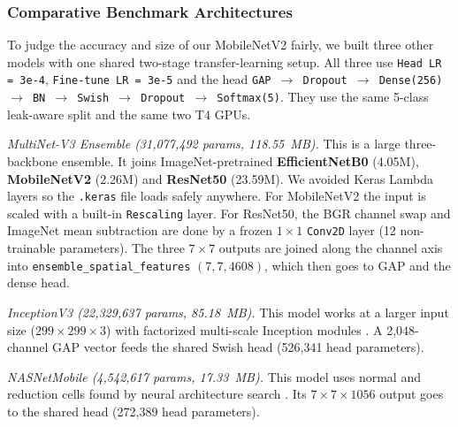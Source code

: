\subsubsection{Comparative Benchmark Architectures}
To judge the accuracy and size of our MobileNetV2 fairly, we built three other models with one shared two-stage transfer-learning setup. All three use \texttt{Head LR = 3e-4}, \texttt{Fine-tune LR = 3e-5} and the head \texttt{GAP $\rightarrow$ Dropout $\rightarrow$ Dense(256) $\rightarrow$ BN $\rightarrow$ Swish $\rightarrow$ Dropout $\rightarrow$ Softmax(5)}. They use the same 5-class leak-aware split and the same two T4 GPUs.

\textit{MultiNet-V3 Ensemble (31,077,492 params, 118.55~MB).} This is a large three-backbone ensemble. It joins ImageNet-pretrained \textbf{EfficientNetB0} \cite{tan2019efficientnet} (4.05M), \textbf{MobileNetV2} \cite{sandler2018mobilenetv2} (2.26M) and \textbf{ResNet50} \cite{he2016deep} (23.59M). We avoided Keras Lambda layers so the \texttt{.keras} file loads safely anywhere. For MobileNetV2 the input is scaled with a built-in \texttt{Rescaling} layer. For ResNet50, the BGR channel swap and ImageNet mean subtraction are done by a frozen $1 \times 1$ \texttt{Conv2D} layer (12 non-trainable parameters). The three $7 \times 7$ outputs are joined along the channel axis into \texttt{ensemble\_\allowbreak spatial\_\allowbreak features} $(7, 7, 4608)$, which then goes to GAP and the dense head.

\textit{InceptionV3 (22,329,637 params, 85.18~MB).} This model works at a larger input size ($299 \times 299 \times 3$) with factorized multi-scale Inception modules \cite{szegedy2016rethinking}. A 2,048-channel GAP vector feeds the shared Swish head (526,341 head parameters).

\textit{NASNetMobile (4,542,617 params, 17.33~MB).} This model uses normal and reduction cells found by neural architecture search \cite{zoph2018learning}. Its $7 \times 7 \times 1056$ output goes to the shared head (272,389 head parameters).

